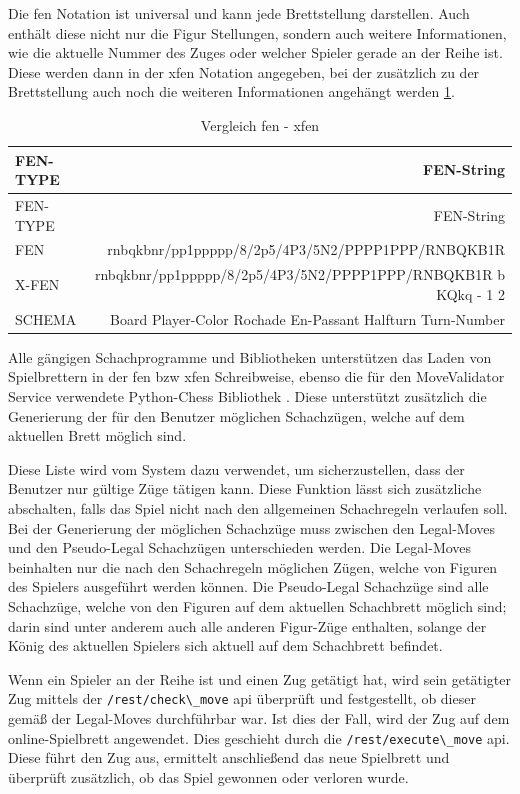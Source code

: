 Die \gls{fen} Notation ist universal und kann jede Brettstellung
darstellen. Auch enthält diese nicht nur die Figur Stellungen, sondern
auch weitere Informationen, wie die aktuelle Nummer des Zuges oder
welcher Spieler gerade an der Reihe ist. Diese werden dann in der
\gls{xfen} Notation angegeben, bei der zusätzlich zu der Brettstellung
auch noch die weiteren Informationen angehängt werden \ref{fenxfen}.

\begin{longtable}[]{@{}lr@{}}
\caption{Vergleich \gls{fen} - \gls{xfen}
\label{fenxfen}}\tabularnewline
\toprule
FEN-TYPE & FEN-String\tabularnewline
\midrule
\endfirsthead
\toprule
FEN-TYPE & FEN-String\tabularnewline
\midrule
\endhead
FEN & rnbqkbnr/pp1ppppp/8/2p5/4P3/5N2/PPPP1PPP/RNBQKB1R\tabularnewline
X-FEN & rnbqkbnr/pp1ppppp/8/2p5/4P3/5N2/PPPP1PPP/RNBQKB1R b KQkq - 1
2\tabularnewline
SCHEMA & Board Player-Color Rochade En-Passant Halfturn
Turn-Number\tabularnewline
\bottomrule
\end{longtable}

Alle gängigen Schachprogramme und Bibliotheken unterstützen das Laden
von Spielbrettern in der \gls{fen} bzw \gls{xfen} Schreibweise, ebenso
die für den MoveValidator Service verwendete Python-Chess Bibliothek
\cite{pythonchesslib}. Diese unterstützt zusätzlich die Generierung
der für den Benutzer möglichen Schachzügen, welche auf dem aktuellen
Brett möglich sind.

Diese Liste wird vom System dazu verwendet, um sicherzustellen, dass der
Benutzer nur gültige Züge tätigen kann. Diese Funktion lässt sich
zusätzliche abschalten, falls das Spiel nicht nach den allgemeinen
Schachregeln verlaufen soll. Bei der Generierung der möglichen
Schachzüge muss zwischen den Legal-Moves und den Pseudo-Legal
Schachzügen unterschieden werden. Die Legal-Moves beinhalten nur die
nach den Schachregeln möglichen Zügen, welche von Figuren des Spielers
ausgeführt werden können. Die Pseudo-Legal Schachzüge sind alle
Schachzüge, welche von den Figuren auf dem aktuellen Schachbrett möglich
sind; darin sind unter anderem auch alle anderen Figur-Züge enthalten,
solange der König des aktuellen Spielers sich aktuell auf dem
Schachbrett befindet.

Wenn ein Spieler an der Reihe ist und einen Zug getätigt hat, wird sein
getätigter Zug mittels der \passthrough{\lstinline!/rest/check\_move!}
\gls{api} überprüft und festgestellt, ob dieser gemäß der Legal-Moves
durchführbar war. Ist dies der Fall, wird der Zug auf dem
online-Spielbrett angewendet. Dies geschieht durch die
\passthrough{\lstinline!/rest/execute\_move!} \gls{api}. Diese führt den
Zug aus, ermittelt anschließend das neue Spielbrett und überprüft
zusätzlich, ob das Spiel gewonnen oder verloren wurde.

